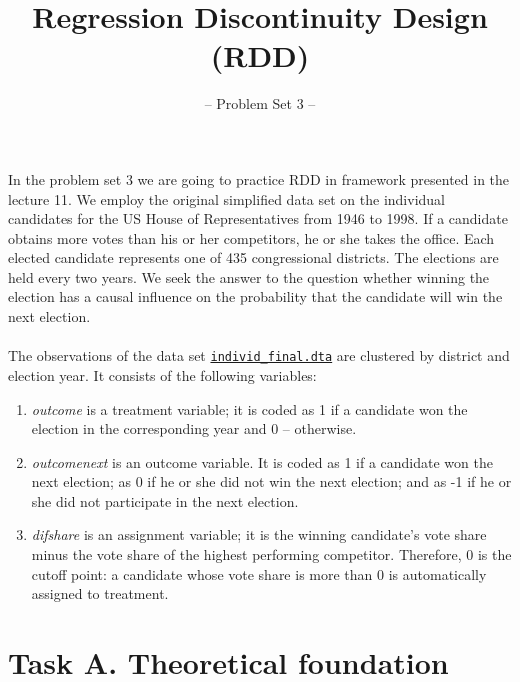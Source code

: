 

\title{Regression Discontinuity Design (RDD)}
\subtitle{-- Problem Set 3 --}
\date{}

\maketitle\vspace{-2cm}

In the problem set 3 we are going to practice RDD in \cite{Lee.2008} framework presented in the lecture 11. We employ the original simplified data set on the individual candidates for the US House of Representatives from 1946 to 1998. If a candidate obtains more votes than his or her competitors, he or she takes the office.  Each elected candidate represents one of 435 congressional districts. The elections are held every two years. We seek the answer to the question whether winning the election has a causal influence on the probability that the candidate will win the next election.\\
\\
The observations of the data set \href{https://github.com/HumanCapitalAnalysis/microeconometrics/tree/prset2/problem-sets/03-regression-discontinuity-design/data}{\texttt{individ\_final.dta}} are clustered by district and election year. It consists of the following variables:
\begin{enumerate}

\item \emph{outcome} is a treatment variable; it is coded as 1 if a candidate won the election in the corresponding year and 0 -- otherwise. 
\item \emph{outcomenext} is an outcome variable. It is coded as 1 if a candidate won the next election; as 0 if he or she did not win the next election; and as -1 if he or she did not participate in the next election. 
\item \emph{difshare} is an assignment variable; it is the winning candidate's vote share minus the vote share of the highest performing competitor. Therefore, 0 is the cutoff point: a candidate whose vote share is more than 0 is automatically assigned to treatment.

\end {enumerate}

\section*{Task A. Theoretical foundation} 

